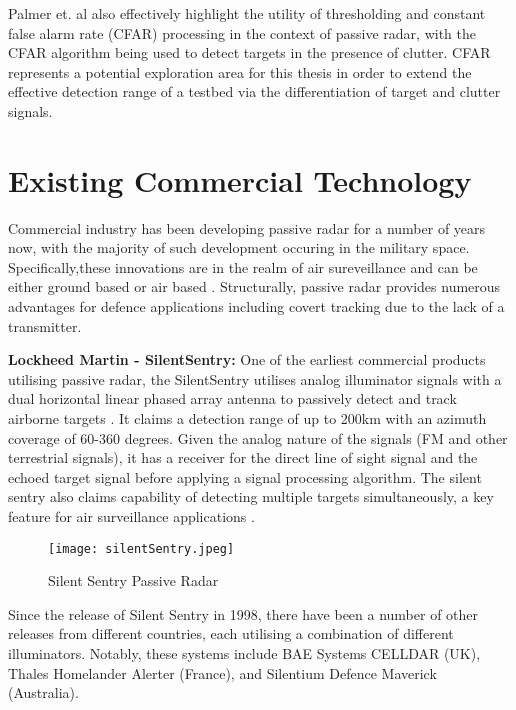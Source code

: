 Palmer et. al also effectively highlight the utility of thresholding and constant false alarm rate (CFAR) processing in the context of passive radar, with the CFAR algorithm being used to detect targets in the presence of clutter. CFAR represents a potential exploration area for this thesis in order to extend the effective detection range of a testbed via the differentiation of target and clutter signals.



\section{Existing Commercial Technology}
Commercial industry has been developing passive radar for a number of years now, with the majority of such development occuring in the military space. Specifically,these innovations are in the realm of air sureveillance and can be either ground based or air based \cite{FundamentalsPassiveRadar}. Structurally, passive radar provides numerous advantages for defence applications including covert tracking due to the lack of a transmitter.
\par \vspace{0.5cm} 
\noindent \textbf{Lockheed Martin - SilentSentry:} One of the earliest commercial products utilising passive radar, the SilentSentry utilises analog illuminator signals with a dual horizontal linear phased array antenna to passively detect and track airborne targets \cite{DTSO2009}. It claims a detection range of up to 200km with an azimuth coverage of 60-360 degrees. Given the analog nature of the signals (FM and other terrestrial signals), it has a receiver for the direct line of sight signal and the echoed target signal before applying a signal processing algorithm. The silent sentry also claims capability of detecting multiple targets simultaneously, a key feature for air surveillance applications \cite{SilentSentry}.

\begin{figure}[htbp]
    \centering
    \texttt{[image: silentSentry.jpeg]}
    \caption{Silent Sentry Passive Radar \cite{SilentSentry}}
    \label{fig:silentSentry}
\end{figure}

Since the release of Silent Sentry in 1998, there have been a number of other releases from different countries, each utilising a combination of different illuminators. Notably, these systems include BAE Systems CELLDAR (UK), Thales Homelander Alerter (France), and Silentium Defence Maverick (Australia). 

